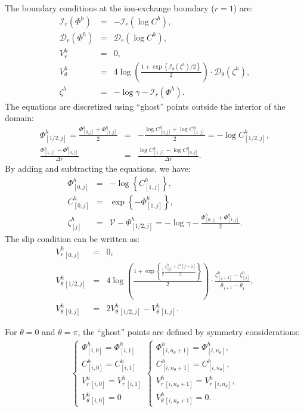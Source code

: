 \documentclass[final]{elsarticle}
\newcommand{\brc}[2]{\left\{\begin{array}{#1}#2\end{array}\right.}
\newcommand{\pars}[1]{\left(#1\right)}
\newcommand{\brcs}[1]{\left\{#1\right\}}
\newcommand\cI{\mathcal{I}}
\newcommand\cD{\mathcal{D}}
\newcommand\cV{\mathscr{V}}
\begin{document}
The boundary conditions at the ion-exchange boundary ($r=1$) are:
\begin{eqnarray*}
\cI_r(\varPhi^h) &=& -\cI_r(\log C^h), \\
\cD_r(\varPhi^h) &=& \cD_r(\log C^h), \\
V^h_r &=& 0, \\
V^h_\theta &=& 4\log\pars{\frac{1 + \exp\left\{\cI_\theta(\zeta^h)/2\right\}}{2}} \cdot 
			\cD_\theta(\zeta^h), \\
  \zeta^h &=& - \log \gamma - \cI_r(\varPhi^h).
\end{eqnarray*}
The equations are discretized using ``ghost'' points outside the interior of the domain:
\begin{eqnarray*}
 \varPhi^h_{[1/2, j]} = \frac{\varPhi^h_{[0,j]} + \varPhi^h_{[1,j]}}{2} &=& 
	-\frac{\log C^h_{[0,j]} + \log C^h_{[1,j]}}{2} = -\log C^h_{[1/2, j]}, \\
  \frac{\varPhi^h_{[1,j]} - \varPhi^h_{[0,j]}}{\Delta r} &=& 
	\frac{\log C^h_{[1,j]} - \log C^h_{[0,j]}}{\Delta r}. 
\end{eqnarray*}
By adding and subtracting the equations, we have:
\begin{eqnarray*}
\varPhi^h_{[0,j]} &=& -\log\brcs{C^h_{[1,j]}}, \\
C^h_{[0,j]} &=& \exp\brcs{-\varPhi^h_{[1,j]}}, \\
  \zeta^h_{[j]} &=& \cV - \varPhi^h_{[1/2,j]}
                     = -\log\gamma -\frac{\varPhi^h_{[0,j]} + \varPhi^h_{[1,j]}}{2}.
\end{eqnarray*}
The slip condition can be written as:
\begin{eqnarray*}
V_r^h{}_{[0,j]} &=& 0, \\
V_\theta^h{}_{[1/2,j]} &=& 
4\log\pars{\frac{1 + \exp\left\{\frac{1}{2}
 \frac{\zeta^h_{[j]} + \zeta^h[j+1]}{2}\right\}}{2}} 
\cdot \frac{\zeta^h_{[j+1]} - \zeta^h_{[j]}}{\bar{\theta}_{j+1} - \bar{\theta}_{j}}, \\
  V^h_\theta{}_{[0,j]} &=& 2 V^h_\theta{}_{[1/2, j]} - V^h_\theta{}_{[1,j]}.
\end{eqnarray*}

For $\theta = 0$ and $\theta = \pi$, the ``ghost'' points are defined by symmetry considerations:
\begin{eqnarray*} 
\brc{l}{
\varPhi^h_{[i, 0]} = \varPhi^h_{[i, 1]} \\
C^h_{[i, 0]} = C^h_{[i, 1]} \\
V_r^h{}_{[i, 0]} = V_r^h{}_{[i, 1]} \\
V_\theta^h{}_{[i, 0]} = 0
} 
\brc{l}{
\varPhi^h_{[i, n_\theta+1]} = \varPhi^h_{[i, n_\theta]}, \\
C^h_{[i, n_\theta+1]} = C^h_{[i, n_\theta]}, \\
V_r^h{}_{[i, n_\theta+1]} = V_r^h{}_{[i, n_\theta]}, \\
V_\theta^h{}_{[i, n_\theta+1]} = 0.
} 
\end{eqnarray*}
\end{document}
